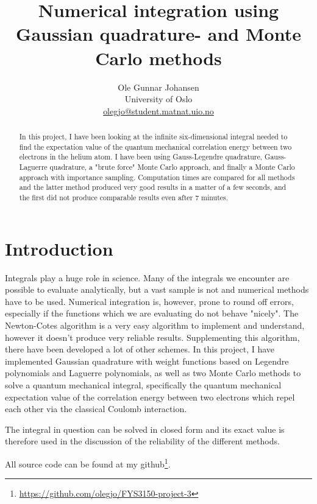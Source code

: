 \documentclass[twoside, 11pt]{article}
\title{\vspace{-15mm}\fontsize{16pt}{13pt}\selectfont\textbf{Numerical integration using Gaussian quadrature- and Monte Carlo methods}} %
\author{
\large
Ole Gunnar Johansen\\[0mm]%
\normalsize University of Oslo \\[0mm] %
\normalsize \href{mailto:olegjo@ulrik.uio.no}{olegjo@student.matnat.uio.no} %
\vspace{5mm}
}
\date{}
\begin{document}
\maketitle %
\thispagestyle{fancy} %


\begin{abstract}

\noindent
In this project, I have been looking at the infinite six-dimensional integral needed to find the expectation value of the quantum mechanical correlation energy between two electrons in the helium atom. I have been using Gauss-Legendre quadrature, Gauss-Laguerre quadrature, a "brute force" Monte Carlo approach, and finally a Monte Carlo approach with importance sampling. Computation times are compared for all methods and the latter method produced very good results in a matter of a few seconds, and the first did not produce comparable results even after 7 minutes. 
\end{abstract}


\section{Introduction}
	Integrals play a huge role in science. Many of the integrals we encounter are possible to evaluate analytically, but a vast sample is not and numerical methods have to be used. Numerical integration is, however, prone to round off errors, especially if the functions which we are evaluating do not behave "nicely". The Newton-Cotes algorithm is a very easy algorithm to implement and understand, however it doesn't produce very reliable results. Supplementing this algorithm, there have been developed a lot of other schemes. In this project, I have implemented Gaussian quadrature with weight functions based on Legendre polynomials and Laguerre polynomials, as well as two Monte Carlo methods to solve a quantum mechanical integral, specifically the quantum mechanical expectation value of the correlation energy between two electrons which repel each other via the classical Coulomb interaction. 
	
	The integral in question can be solved in closed form and its exact value is therefore used in the discussion of the reliability of the different methods.
	
	All source code can be found at my github\footnote{\url{https://github.com/olegjo/FYS3150-project-3}}.
\end{document}
